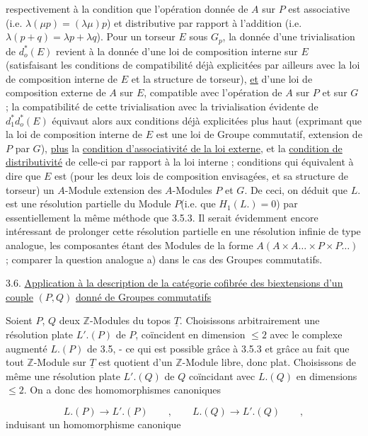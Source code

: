  respectivement à la condition que l'opération donnée de $A$ sur $P$ est associative (i.e. $\lambda(\mu p) = (\lambda\mu)p$) et distributive par rapport à l'addition (i.e. $\lambda(p+q) = \lambda p + \lambda q$). Pour un torseur $E$ sous $G_p$, la donnée d'une trivialisation de $d_o^*(E)$ revient à la donnée d'une loi de composition interne sur $E$ (satisfaisant les conditions de compatibilité déjà explicitées par ailleurs avec la loi de composition interne de $E$ et la structure de torseur), \underline{et} d'une loi de composition externe de $A$ sur $E$, compatible avec l'opération de $A$ sur $P$ et sur $G$ ; la compatibilité de cette trivialisation avec la trivialisation évidente de $d_1^* d_o^*(E)$ équivaut alors aux conditions déjà explicitées plus haut (exprimant que la loi de composition interne de $E$ est une loi de Groupe commutatif, extension de $P$ par $G$), \underline{plus} la \underline{condition d'associativité de la loi externe}, et la \underline{condition de distributivité} de celle-ci par rapport à la loi interne ; conditions qui équivalent à dire que $E$ est (pour les deux lois de composition envisagées, et sa structure de torseur) un $A$-Module extension des $A$-Modules $P$ et $G$. De ceci, on déduit que $L.$ est une résolution partielle du Module $P$(i.e. que $H_1(L.) = 0$) par essentiellement la même méthode que 3.5.3. Il serait évidemment encore intéressant de prolonger cette résolution partielle en une résolution infinie de type analogue, les composantes étant des Modules de la forme $A(A \times A \ldots \times P \times P \ldots)$ ; comparer la question analogue a) dans le cas des Groupes commutatifs.




3.6.  \underline{Application à la description de la catégorie cofibrée des biextensions d'un couple} $(P,Q)$ \underline{donné de Groupes commutatifs}

Soient $P$, $Q$ deux $\mathbb{Z}$-Modules du topos $\underline{T}$. Choisissons arbitrairement une résolution plate $L'.(P)$ de $P$, coïncident en dimension $\leq 2$ avec le complexe augmenté $L.(P)$ de 3.5, - ce qui est possible grâce à 3.5.3 et grâce au fait que tout $\mathbb{Z}$-Module sur $\underline{T}$ est quotient d'un $\mathbb{Z}$-Module libre, donc plat. Choisissons de même une résolution plate $L'.(Q)$ de $Q$ coïncidant avec $L.(Q)$ en dimensions $\leq 2$. On a donc des homomorphismes canoniques

\begin{equation}\tag{3.6.1}
L.(P) \longrightarrow L'.(P) \qquad , \qquad L.(Q) \longrightarrow L'.(Q) \qquad ,
\end{equation}
induisant un homomorphisme canonique

